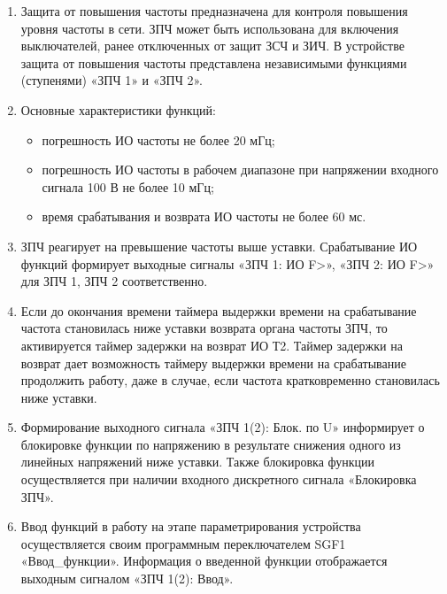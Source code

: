 
\color{black}

\begin{enumerate}

\item
Защита от повышения частоты предназначена для контроля повышения уровня частоты в сети. ЗПЧ может быть использована для включения выключателей, ранее отключенных от защит ЗСЧ и ЗИЧ. В устройстве защита от повышения частоты представлена независимыми функциями (ступенями) «ЗПЧ 1» и «ЗПЧ 2».

\item
Основные характеристики функций:
\begin{itemize}
    \item погрешность ИО частоты не более 20 мГц;
    \item погрешность ИО частоты в рабочем диапазоне при напряжении входного сигнала 100 В не более 10 мГц; 
    \item время срабатывания и возврата ИО частоты не более 60 мс.
\end{itemize}

\item
ЗПЧ реагирует на превышение частоты выше уставки. Срабатывание ИО функций формирует выходные сигналы «ЗПЧ 1: ИО F>», «ЗПЧ 2: ИО F>» для ЗПЧ 1, ЗПЧ 2 соответственно.

\item
Если до окончания времени таймера выдержки времени на срабатывание частота становилась ниже уставки возврата органа частоты ЗПЧ, то активируется таймер задержки на возврат ИО Т2. Таймер задержки на возврат дает возможность таймеру выдержки времени на срабатывание продолжить работу, даже в случае, если частота кратковременно становилась ниже уставки.

\item
Формирование выходного сигнала «ЗПЧ 1(2): Блок. по U» информирует о блокировке функции по напряжению в результате снижения одного из линейных напряжений ниже уставки. Также блокировка функции осуществляется при наличии входного дискретного сигнала «Блокировка ЗПЧ».

\item
Ввод функций в работу на этапе параметрирования устройства осуществляется своим программным переключателем SGF1 «Ввод\_функции». Информация о введенной функции отображается выходным сигналом «ЗПЧ 1(2): Ввод».


\end{enumerate}
